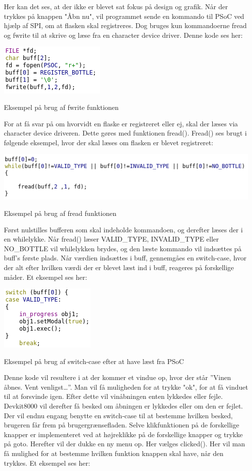Her kan det ses, at der ikke er blevet sat fokus på design og grafik. Når der trykkes på knappen "Åbn nu", vil programmet sende en kommando til PSoC ved hjælp af SPI, om at flasken skal registreres. Dog bruges kun kommandoerne fread og fwrite til at skrive og læse fra en character device driver. Denne kode ses her:

\includegraphics{Billeder/write}
\caption{Eksempel på brug af fwrite funktionen}

For at få svar på om hvorvidt en flaske er registreret eller ej, skal der læses via character device driveren. Dette gøres med funktionen fread(). Fread() ses brugt i følgende eksempel, hvor der skal læses om flasken er blevet registreret:

\includegraphics{Billeder/read}
\caption{Eksempel på brug af fread funktionen}

Først nulstilles bufferen som skal indeholde kommandoen, og derefter læses der i en whilelykke. Når fread() læser VALID_TYPE, INVALID_TYPE eller NO_BOTTLE vil whilelykken brydes, og den læste kommando vil indsættes på buff’s første plads. Når værdien indsættes i buff, gennemgåes en switch-case, hvor der alt efter hvilken værdi der er blevet læst ind i buff, reageres på forskellige måder. Et eksempel ses her:

\includegraphics{Billeder/switch}
\caption{Eksempel på brug af switch-case efter at have læst fra PSoC}

Denne kode vil resultere i at der kommer et vindue op, hvor der står ”Vinen åbnes. Vent venligst…”. Man vil få muligheden for at trykke "ok", for at få vinduet til at forsvinde igen. 
Efter dette vil vinåbningen enten lykkedes eller fejle. Devkit8000 vil derefter få besked om åbningen er lykkedes eller om den er fejlet. Der vil endnu engang benytte en switch-case til at bestemme hvilken besked, brugeren får frem på brugergrænsefladen.
Selve klikfunktionen på de forskellige knapper er implementeret ved at højreklikke på de forskellige knapper og trykke på goto. Herefter vil der dukke en ny menu op. Her vælges clicked(). Her vil man få mulighed for at bestemme hvilken funktion knappen skal have, når den trykkes. Et eksempel ses her:

